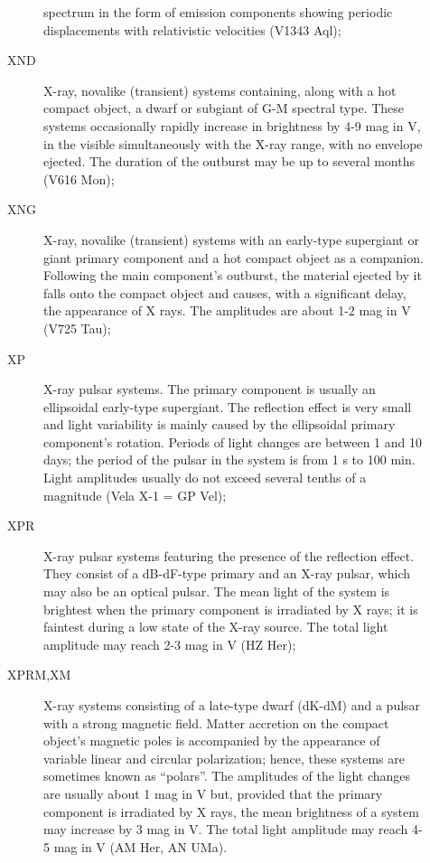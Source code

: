 \begin{description}
\begin{description}
             spectrum in the form of emission components showing periodic
             displacements with relativistic velocities (V1343 Aql);
\item[XND]   X-ray, novalike (transient) systems containing, along with
             a hot compact object, a dwarf or subgiant of G-M spectral type. These
             systems occasionally rapidly increase in brightness by 4-9 mag in V, in
             the visible simultaneously with the X-ray range, with no envelope
             ejected. The duration of the outburst may be up to several months (V616 Mon);
\item[XNG]   X-ray, novalike (transient) systems with an early-type
             supergiant or giant primary component and a hot compact object as a
             companion. Following the main component's outburst, the material ejected
             by it falls onto the compact object and causes, with a significant
             delay, the appearance of X rays. The amplitudes are about 1-2 mag in V (V725 Tau);
\item[XP]    X-ray pulsar systems. The primary component is usually an
             ellipsoidal early-type supergiant. The reflection effect is very small
             and light variability is mainly caused by the ellipsoidal primary
             component's rotation. Periods of light changes are between 1 and 10
             days; the period of the pulsar in the system is from 1 s to 100 min.
             Light amplitudes usually do not exceed several tenths of a magnitude
             (Vela X-1 = GP Vel);
\item[XPR]   X-ray pulsar systems featuring the presence of the
             reflection effect. They consist of a dB-dF-type primary and an X-ray
             pulsar, which may also be an optical pulsar. The mean light of the
             system is brightest when the primary component is irradiated by X rays;
             it is faintest during a low state of the X-ray source. The total light
             amplitude may reach 2-3 mag in V (HZ Her);
\item[XPRM,XM] X-ray systems consisting of a late-type dwarf (dK-dM)
             and a pulsar with a strong magnetic field. Matter accretion on the
             compact object's magnetic poles is accompanied by the appearance of
             variable linear and circular polarization; hence, these systems are
             sometimes known as ``polars''. The amplitudes of the light changes are
             usually about 1 mag in V but, provided that the primary component is
             irradiated by X rays, the mean brightness of a system may increase by 3
             mag in V. The total light amplitude may reach 4-5 mag in V (AM Her, AN UMa).
	\end{description}
\end{description}

